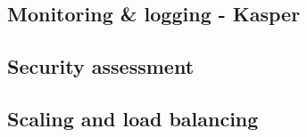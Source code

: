 \subsection{Monitoring \& logging - Kasper}
\subsection{Security assessment}
\subsection{Scaling and load balancing}
